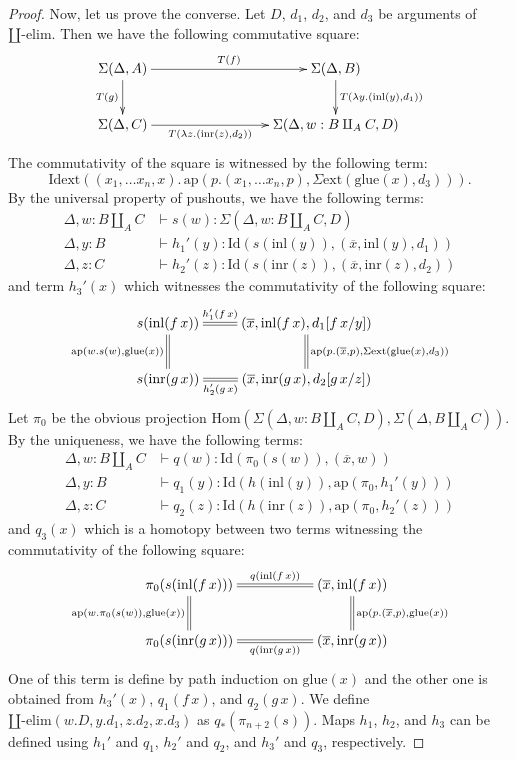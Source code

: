 \documentclass[reqno]{amsart}
\theoremstyle{definition}
\theoremstyle{remark}
\newcommand{\fs}[1]{\mathrm{#1}}
\newcommand{\Hom}{\fs{Hom}}
\newcommand{\Id}{\fs{Id}}
\newcommand{\pmap}{\fs{ap}}
\numberwithin{figure}{section}
\begin{document}
\begin{proof}
Now, let us prove the converse.
Let $D$, $d_1$, $d_2$, and $d_3$ be arguments of $\amalg\text{-}\fs{elim}$.
Then we have the following commutative square:
\[ \xymatrix{ \Sigma(\Delta,A) \ar[rrr]^-{T(f)} \ar[d]_{T(g)}               & & & \Sigma(\Delta,B) \ar[d]^{T(\lambda y.(\fs{inl}(y),d_1))} \\
              \Sigma(\Delta,C) \ar[rrr]_-{T(\lambda z.(\fs{inr}(z),d_2))}   & & & \Sigma(\Delta, w : B \amalg_A C, D)
            } \]
The commutativity of the square is witnessed by the following term:
\[ \fs{Idext}((x_1, \ldots x_n, x).\,\pmap(p.(x_1, \ldots x_n, p), \Sigma\fs{ext}(\fs{glue}(x),d_3))). \]
By the universal property of pushouts, we have the following terms:
\begin{align*}
\Delta, w : B \amalg_A C & \vdash s(w) : \Sigma(\Delta, w : B \amalg_A C, D) \\
\Delta, y : B & \vdash h_1'(y) : \Id(s(\fs{inl}(y)),(\overline{x},\fs{inl}(y),d_1)) \\
\Delta, z : C & \vdash h_2'(z) : \Id(s(\fs{inr}(z)),(\overline{x},\fs{inr}(z),d_2))
\end{align*}
and term $h_3'(x)$ which witnesses the commutativity of the following square:
\[ \xymatrix{ s(\fs{inl}(f\,x)) \ar@{=}[r]^-{h_1'(f\,x)} \ar@{=}[d]_{\pmap(w.s(w),\fs{glue}(x))} & (\overline{x},\fs{inl}(f\,x),d_1[f\,x/y]) \ar@{=}[d]^{\pmap(p.(\overline{x},p),\Sigma\fs{ext}(\fs{glue}(x),d_3))} \\
              s(\fs{inr}(g\,x)) \ar@{=}[r]_-{h_2'(g\,x)} & (\overline{x},\fs{inr}(g\,x),d_2[g\,x/z])
            } \]
Let $\pi_0$ be the obvious projection $\Hom(\Sigma(\Delta, w : B \amalg_A C, D), \Sigma(\Delta, B \amalg_A C))$.
By the uniqueness, we have the following terms:
\begin{align*}
\Delta, w : B \amalg_A C & \vdash q(w) : \Id(\pi_0(s(w)),(\overline{x},w)) \\
\Delta, y : B & \vdash q_1(y) : \Id(h(\fs{inl}(y)),\pmap(\pi_0,h_1'(y))) \\
\Delta, z : C & \vdash q_2(z) : \Id(h(\fs{inr}(z)),\pmap(\pi_0,h_2'(z)))
\end{align*}
and $q_3(x)$ which is a homotopy between two terms witnessing the commutativity of the following square:
\[ \xymatrix{ \pi_0(s(\fs{inl}(f\,x))) \ar@{=}[rr]^-{q(\fs{inl}(f\,x))} \ar@{=}[d]_{\pmap(w.\pi_0(s(w)),\fs{glue}(x))} & & (\overline{x},\fs{inl}(f\,x)) \ar@{=}[d]^{\pmap(p.(\overline{x},p),\fs{glue}(x))} \\
              \pi_0(s(\fs{inr}(g\,x))) \ar@{=}[rr]_-{q(\fs{inr}(g\,x))} & & (\overline{x},\fs{inr}(g\,x))
            } \]
One of this term is define by path induction on $\fs{glue}(x)$ and the other one is obtained from $h_3'(x)$, $q_1(f\,x)$, and $q_2(g\,x)$.
We define $\amalg\text{-}\fs{elim}(w.D, y.d_1, z.d_2, x.d_3)$ as $q_*(\pi_{n+2}(s))$.
Maps $h_1$, $h_2$, and $h_3$ can be defined using $h_1'$ and $q_1$, $h_2'$ and $q_2$, and $h_3'$ and $q_3$, respectively.
\end{proof}
\end{document}
